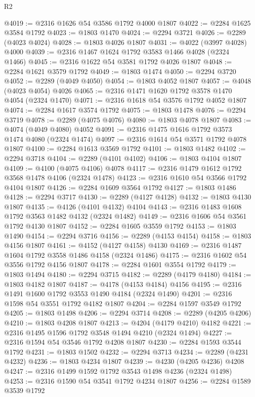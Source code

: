 \begin{lexlean}{R2}
\begin{coremodule}
@4019 := @2316 @1626 @54 @3586 @1792 @4000 @1807
@4022 := @2284 @1625 @3584 @1792
@4023 := @1803 @1470
@4024 := @2294 @3721
@4026 := @2289 (@4023 @4024)
@4028 := @1803 @4026 @1807
@4031 := @4022 (@3997 @4028) @4000
@4039 := @2316 @1467 @1624 @1792 @3583 @1466 @4028 (@2324 @1466)
@4045 := @2316 @1622 @54 @3581 @1792 @4026 @1807
@4048 := @2284 @1621 @3579 @1792
@4049 := @1803 @1474
@4050 := @2294 @3720
@4052 := @2289 (@4049 @4050)
@4054 := @1803 @4052 @1807
@4057 := @4048 (@4023 @4054) @4026
@4065 := @2316 @1471 @1620 @1792 @3578 @1470 @4054 (@2324 @1470)
@4071 := @2316 @1618 @54 @3576 @1792 @4052 @1807
@4074 := @2284 @1617 @3574 @1792
@4075 := @1803 @1478
@4076 := @2294 @3719
@4078 := @2289 (@4075 @4076)
@4080 := @1803 @4078 @1807
@4083 := @4074 (@4049 @4080) @4052
@4091 := @2316 @1475 @1616 @1792 @3573 @1474 @4080 (@2324 @1474)
@4097 := @2316 @1614 @54 @3571 @1792 @4078 @1807
@4100 := @2284 @1613 @3569 @1792
@4101 := @1803 @1482
@4102 := @2294 @3718
@4104 := @2289 (@4101 @4102)
@4106 := @1803 @4104 @1807
@4109 := @4100 (@4075 @4106) @4078
@4117 := @2316 @1479 @1612 @1792 @3568 @1478 @4106 (@2324 @1478)
@4123 := @2316 @1610 @54 @3566 @1792 @4104 @1807
@4126 := @2284 @1609 @3564 @1792
@4127 := @1803 @1486
@4128 := @2294 @3717
@4130 := @2289 (@4127 @4128)
@4132 := @1803 @4130 @1807
@4135 := @4126 (@4101 @4132) @4104
@4143 := @2316 @1483 @1608 @1792 @3563 @1482 @4132 (@2324 @1482)
@4149 := @2316 @1606 @54 @3561 @1792 @4130 @1807
@4152 := @2284 @1605 @3559 @1792
@4153 := @1803 @1490
@4154 := @2294 @3716
@4156 := @2289 (@4153 @4154)
@4158 := @1803 @4156 @1807
@4161 := @4152 (@4127 @4158) @4130
@4169 := @2316 @1487 @1604 @1792 @3558 @1486 @4158 (@2324 @1486)
@4175 := @2316 @1602 @54 @3556 @1792 @4156 @1807
@4178 := @2284 @1601 @3554 @1792
@4179 := @1803 @1494
@4180 := @2294 @3715
@4182 := @2289 (@4179 @4180)
@4184 := @1803 @4182 @1807
@4187 := @4178 (@4153 @4184) @4156
@4195 := @2316 @1491 @1600 @1792 @3553 @1490 @4184 (@2324 @1490)
@4201 := @2316 @1598 @54 @3551 @1792 @4182 @1807
@4204 := @2284 @1597 @3549 @1792
@4205 := @1803 @1498
@4206 := @2294 @3714
@4208 := @2289 (@4205 @4206)
@4210 := @1803 @4208 @1807
@4213 := @4204 (@4179 @4210) @4182
@4221 := @2316 @1495 @1596 @1792 @3548 @1494 @4210 (@2324 @1494)
@4227 := @2316 @1594 @54 @3546 @1792 @4208 @1807
@4230 := @2284 @1593 @3544 @1792
@4231 := @1803 @1502
@4232 := @2294 @3713
@4234 := @2289 (@4231 @4232)
@4236 := @1803 @4234 @1807
@4239 := @4230 (@4205 @4236) @4208
@4247 := @2316 @1499 @1592 @1792 @3543 @1498 @4236 (@2324 @1498)
@4253 := @2316 @1590 @54 @3541 @1792 @4234 @1807
@4256 := @2284 @1589 @3539 @1792

\end{coremodule}
\end{lexlean}
